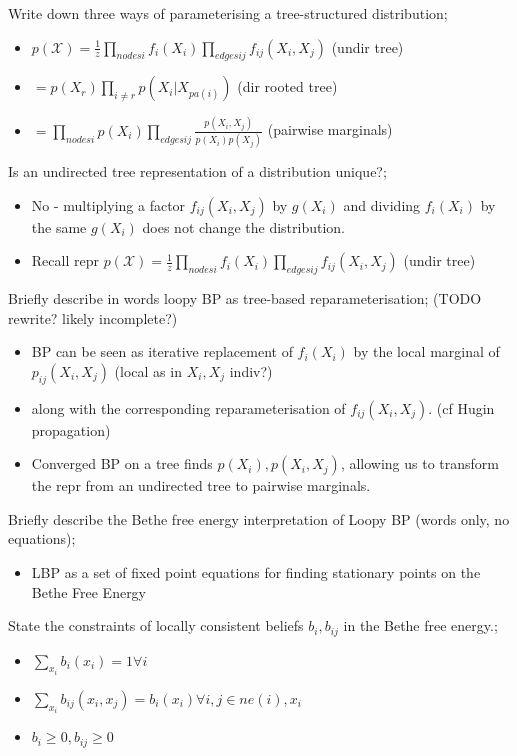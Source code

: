 \documentclass{article}
\begin{document}
Write down three ways of parameterising a tree-structured distribution; \begin{itemize}
    \item $p(\mathcal{X}) = \frac{1}{z}\prod_{nodes i}f_i(X_i)\prod_{edges ij}f_{ij}(X_i, X_j)$ (undir tree)
    \item $= p(X_r)\prod_{i \ne r} p(X_i|X_{pa(i)})$ (dir rooted tree)
    \item $=\prod_{nodes i}p(X_i)\prod_{edges ij}\frac{p(X_i, X_j)}{p(X_i)p(X_j)}$ (pairwise marginals)
\end{itemize}

Is an undirected tree representation of a distribution unique?; \begin{itemize}
    \item No - multiplying a factor $f_{ij}(X_i, X_j)$ by $g(X_i)$ and dividing $f_i(X_i)$ by the same $g(X_i)$ does not change the distribution.
    \item Recall repr $p(\mathcal{X}) = \frac{1}{z}\prod_{nodes i}f_i(X_i)\prod_{edges ij}f_{ij}(X_i, X_j)$ (undir tree)
\end{itemize}

Briefly describe in words loopy BP as tree-based reparameterisation; (TODO rewrite? likely incomplete?) \begin{itemize}
    \item BP can be seen as iterative replacement of $f_i(X_i)$ by the local marginal of $p_{ij}(X_i, X_j)$ (local as in $X_i, X_j$ indiv?)
    \item along with the corresponding reparameterisation of $f_{ij}(X_i, X_j)$. (cf Hugin propagation)
    \item Converged BP on a tree finds $p(X_i), p(X_i, X_j)$, allowing us to transform the repr from an undirected tree to pairwise marginals.
\end{itemize}


Briefly describe the Bethe free energy interpretation of Loopy BP (words only, no equations); \begin{itemize}
    \item LBP as a set of fixed point equations for finding stationary points on the Bethe Free Energy
\end{itemize}

State the constraints of locally consistent beliefs $b_i, b_{ij}$ in the Bethe free energy.; \begin{itemize}
    \item $\sum_{x_i} b_i(x_i) = 1 \forall i$
    \item $\sum_{x_i}b_{ij}(x_i, x_j) = b_i(x_i) \forall i, j \in ne(i), x_i$
    \item $b_i \geq 0, b_{ij} \geq 0$
\end{itemize}
\end{document}
